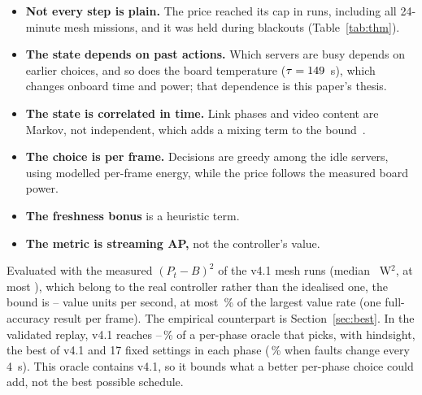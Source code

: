 \documentclass[conference]{IEEEtran}
\begin{document}
\begin{itemize}
\item \textbf{Not every step is plain.} The price reached its cap in \ThmCapRuns{} runs, including all \ThmLongRuns{}
24-minute mesh missions, and it was held during blackouts (Table~\ref{tab:thm}).
\item \textbf{The state depends on past actions.} Which servers are busy depends on earlier choices, and so does the
board temperature ($\tau = 149$~s), which changes onboard time and power; that dependence is this paper's thesis.
\item \textbf{The state is correlated in time.} Link phases and video content are Markov, not independent, which adds a
mixing term to the bound~\cite{Neely_2010}.
\item \textbf{The choice is per frame.} Decisions are greedy among the idle servers, using modelled per-frame energy,
while the price follows the measured board power.
\item \textbf{The freshness bonus} is a heuristic term.
\item \textbf{The metric is streaming AP,} not the controller's value.
\end{itemize}
Evaluated with the measured $(P_t - B)^2$ of the \ThmMsqRuns{} v4.1 mesh runs (median \ThmMsqMed~W$^2$, at most
\ThmMsqMax), which belong to the real controller rather than the idealised one, the bound is \ThmGapMed--\ThmGapMax{}
value units per second, at most \ThmGapPct\,\% of the largest value rate (one full-accuracy result per frame). The
empirical counterpart is Section~\ref{sec:best}. In the validated replay, v4.1 reaches
\OracleShareMin--\OracleShareMax\,\% of a per-phase oracle that picks, with hindsight, the best of v4.1 and 17 fixed
settings in each phase (\OracleShareRandom\,\% when faults change every 4~s). This oracle contains v4.1, so it bounds
what a better per-phase choice could add, not the best possible schedule.
\end{document}
